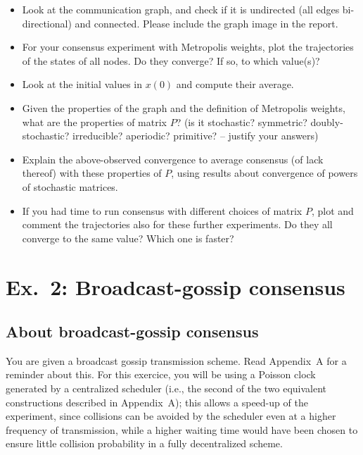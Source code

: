 \documentclass[oneside]{article}
\begin{document}
\begin{itemize}
\item Look at the communication graph, and check if it is undirected (all edges bi-directional) and connected. Please include the graph image in the report.
\item For your consensus experiment with Metropolis weights, plot the trajectories of the states of all nodes. Do they converge? If so, to which value(s)?
\item Look at the initial values in $x(0)$ and compute their average.
\item Given the properties of the graph and the definition of Metropolis weights, what are the properties of matrix $P$? (is it stochastic? symmetric? doubly-stochastic? irreducible? aperiodic? primitive? -- justify your answers)
\item 
Explain the above-observed convergence to average consensus (of lack thereof) with these properties of $P$, using results about convergence of powers of stochastic matrices.
\item If you had time to run consensus with different choices of matrix $P$, plot and comment the trajectories also for these further experiments. Do they all converge to the same value? Which one is faster?
\end{itemize}

\newpage


\section{Ex.~2: Broadcast-gossip consensus}

\subsection{About broadcast-gossip consensus} \label{sec:about-gossip}


You are given a broadcast gossip transmission scheme. Read Appendix~A for a reminder about this.
For this exercice, you will be using a Poisson clock generated by a centralized scheduler (i.e., the second of the two equivalent constructions described in Appendix~A); this allows a speed-up of the experiment, since collisions can be avoided by the scheduler even at a higher frequency of transmission, while a higher waiting time would have been chosen to ensure little collision probability in a fully decentralized scheme.\\
\end{document}
